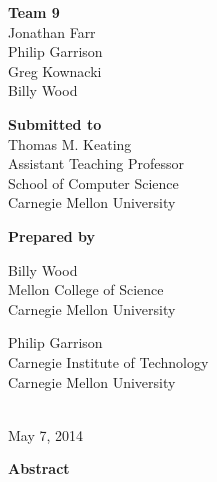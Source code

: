 \documentclass{article}
\begin{document}
\vspace{4em}

\begin{center}
\textbf{Team 9}\\
Jonathan Farr\\
Philip Garrison\\
Greg Kownacki\\
Billy Wood
\end{center}

\vspace{4em}

\begin{center}
\textbf{Submitted to}\\
Thomas M. Keating\\
Assistant Teaching Professor\\
School of Computer Science\\
Carnegie Mellon University
\end{center}

\vspace{4em}

\begin{center}
\textbf{Prepared by}\\
\begin{minipage}[c][3.7em][t]{.45\textwidth}
\begin{center}
Billy Wood\\
Mellon College of Science\\
Carnegie Mellon University
\end{center}
\end{minipage}
\begin{minipage}[c][3.7em][t]{.45\textwidth}
\begin{center}
Philip Garrison\\
Carnegie Institute of Technology\\
Carnegie Mellon University
\end{center}
\end{minipage}\\
May 7, 2014
\end{center}

\vfill

\begin{center}
\bf
Abstract
\end{center}


\clearpage

\tableofcontents
\end{document}

